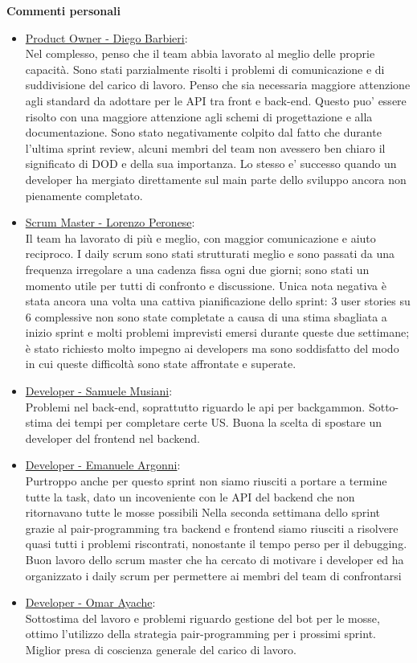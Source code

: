 \documentclass{article}
\begin{document}
\textbf{Commenti personali}
\begin{itemize}
    \item \underline{Product Owner - Diego Barbieri}: \\
    Nel complesso, penso che il team abbia lavorato al meglio delle proprie capacità. Sono stati parzialmente risolti i problemi di comunicazione
    e di suddivisione del carico di lavoro. Penso che sia necessaria maggiore attenzione agli standard da adottare per le API tra front e back-end.
    Questo puo' essere risolto con una maggiore attenzione agli schemi di progettazione e alla documentazione.
    Sono stato negativamente colpito dal fatto che durante l'ultima sprint review, alcuni membri del team non avessero ben chiaro il significato di DOD
    e della sua importanza. Lo stesso e' successo quando un developer ha mergiato direttamente sul main parte dello sviluppo ancora non pienamente completato.

    \item \underline{Scrum Master - Lorenzo Peronese}: \\
    Il team ha lavorato di più e meglio, con maggior comunicazione e aiuto reciproco.
    I daily scrum sono stati strutturati meglio e sono passati da una frequenza irregolare a una cadenza fissa ogni due giorni; sono stati un momento utile per
    tutti di confronto e discussione.
    Unica nota negativa è stata ancora una volta una cattiva pianificazione dello sprint: 3 user stories su 6 complessive non sono state
    completate a causa di una stima sbagliata a inizio sprint e molti problemi imprevisti emersi durante queste due settimane; è stato richiesto molto impegno 
    ai developers ma sono soddisfatto del modo in cui queste difficoltà sono state affrontate e superate.

    \item \underline{Developer - Samuele Musiani}: \\
    Problemi nel back-end, soprattutto riguardo le api per backgammon. Sotto-stima dei tempi per completare certe US. Buona la scelta di spostare
    un developer del frontend nel backend.

    \item \underline{Developer - Emanuele Argonni}: \\
    Purtroppo anche per questo sprint non siamo riusciti a portare a termine tutte la task,
    dato un incoveniente con le API del backend che non ritornavano tutte le mosse possibili
    Nella seconda settimana dello sprint grazie al pair-programming tra backend e frontend siamo riusciti a risolvere quasi tutti i problemi riscontrati,
    nonostante il tempo perso per il debugging.
    Buon lavoro dello scrum master che ha cercato di motivare i developer ed ha organizzato i daily scrum per permettere ai membri del team di confrontarsi
    
    \item \underline{Developer - Omar Ayache}:\\
    Sottostima del lavoro e problemi riguardo gestione del bot per le mosse, ottimo l'utilizzo della strategia pair-programming per i prossimi sprint.
    Miglior presa di coscienza generale del carico di lavoro.    
\end{itemize} 
\end{document}
